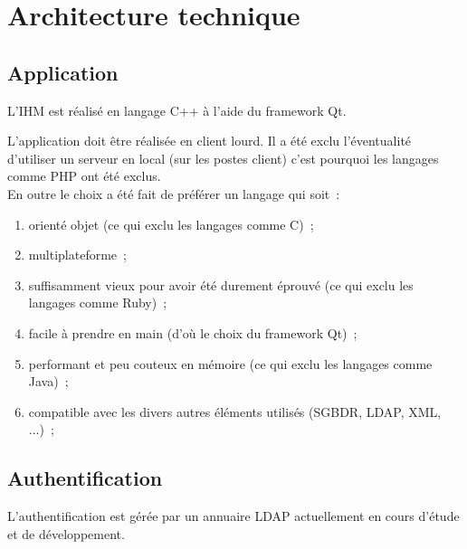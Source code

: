 \chapter{Architecture technique}\label{Architecture_technique}

\section{Application}
L'IHM est réalisé en langage C++ à l'aide du framework Qt.
\begin{notation}
L'application doit être réalisée en client lourd.
Il a été exclu l'éventualité d'utiliser un serveur en local (sur les postes client) c'est pourquoi les langages comme PHP ont été exclus.
\\
En outre le choix a été fait de préférer un langage qui soit~:
\begin{enumerate}
	\item orienté objet (ce qui exclu les langages comme C)~;
	\item multiplateforme~;
	\item suffisamment vieux pour avoir été durement éprouvé (ce qui exclu les langages comme Ruby)~;
	\item facile à prendre en main (d'où le choix du framework Qt)~;
	\item performant et peu couteux en mémoire (ce qui exclu les langages comme Java)~;
	\item compatible avec les divers autres éléments utilisés (SGBDR, LDAP, XML, ...)~;
\end{enumerate}
\end{notation}

\section{Authentification}
L'authentification est gérée par un annuaire LDAP actuellement en cours d'étude et de développement.

\clearpage


\clearpage


\clearpage


\clearpage
